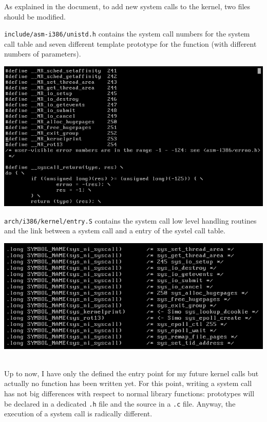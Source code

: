 \documentclass{article}
\begin{document}
\newpage
As explained in the document, to add new system calls to the kernel, two files should be modified.\\
\begin{minipage}{0.4\textwidth}
  \texttt{include/asm-i386/unistd.h} contains the system call numbers for the system call table
  and seven different template prototype for the function (with different numbers of parameters).
\end{minipage}
\begin{minipage}{0.65\textwidth}
  \centering
  \includegraphics[width=.8\textwidth]{./unistd.png}
\end{minipage}
\begin{minipage}{0.4\textwidth}
\texttt{arch/i386/kernel/entry.S} contains the system call low level handling routines and 
       the link between a system call and a entry of the systel call table.
\end{minipage}
\begin{minipage}{0.65\textwidth}
  \centering
  \includegraphics[width=.8\textwidth]{./entrys.png}
\end{minipage}
\\


Up to now, I have only the defined the entry point for my future kernel calls but actually no function has been 
written yet. For this point, writing a system call has not big differences with respect to normal library functions:
prototypes will be declared in a dedicated \texttt{.h} file and the source in a \texttt{.c} file. Anyway, the execution
of a system call is radically different.\\
\end{document}
